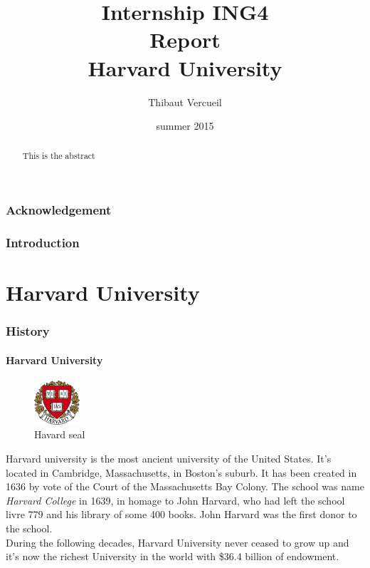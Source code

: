 \documentclass[10pt,a4paper]{article}
\title{{\Huge Internship ING4}\\ Report\\ \vspace{1cm} Harvard University}
\author{Thibaut Vercueil}
\date{summer 2015}
\begin{document}
\maketitle
{}
\begin{abstract}
This is the abstract\end{abstract}
\newpage
\tableofcontents
\newpage
\section*{Acknowledgement}

\section{Introduction}
\newpage
\part{Harvard University}


\section{History}

\subsection{Harvard University}


\begin{figure}
\centering
\includegraphics[width=0.15\textwidth]{harvardlogo.png}
\caption*{Havard seal}
\end{figure}
Harvard university is the most ancient university of the United States. It's located in Cambridge, Massachusetts, in Boston's suburb. It has been created in 1636 by vote of the Court of the Massachusetts Bay Colony. The school was name \textit{Harvard College} in 1639, in homage to John Harvard, who had left the school livre 779 and his library of some 400 books. John Harvard was the first donor to the school.\\
During the following decades, Harvard University never ceased to grow up and it's now the richest University in the world with \$36.4 billion of endowment.
\end{document}
